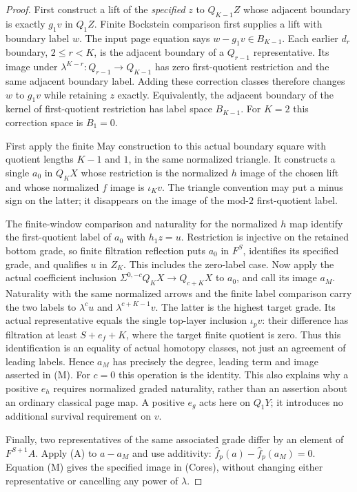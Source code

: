 \begin{proof}
First construct a lift of the \emph{specified} $z$ to $Q_{K-1}Z$ whose
adjacent boundary is exactly $g_1v$ in $Q_1Z$. Finite Bockstein comparison
first supplies a lift with boundary label $w$. The input page equation
says $w-g_1v\in B_{K-1}$. Each earlier $d_r$ boundary, $2\leq r<K$,
is the adjacent boundary of a $Q_{r-1}$ representative. Its image under
$\lambda^{K-r}:Q_{r-1}\to Q_{K-1}$ has zero first-quotient restriction
and the same adjacent boundary label. Adding these correction classes
therefore changes $w$ to $g_1v$ while retaining $z$ exactly.
Equivalently, the adjacent boundary of the kernel of first-quotient
restriction has label space $B_{K-1}$. For $K=2$ this correction space
is $B_1=0$.

First apply the finite May construction to this actual boundary square
with quotient lengths $K-1$ and $1$, in the same normalized triangle.
It constructs a single $a_0$ in $Q_KX$ whose restriction is the normalized
$h$ image of the chosen lift and whose normalized $f$ image is
$\iota_Kv$. The triangle convention may put a minus sign on the latter;
it disappears on the image of the mod-$2$ first-quotient label.

The finite-window comparison and naturality for the normalized $h$
map identify the first-quotient label of $a_0$ with $h_1z=u$.
Restriction is injective on the retained bottom grade, so finite
filtration reflection puts $a_0$ in $F^S$, identifies its specified
grade, and qualifies $u$ in $Z_K$. This includes the zero-label case.
Now apply the actual coefficient inclusion
$\Sigma^{0,-c}Q_KX\to Q_{c+K}X$ to $a_0$, and call its image $a_M$.
Naturality with the same normalized arrows and the finite label
comparison carry the two labels to $\lambda^cu$ and
$\lambda^{c+K-1}v$. The latter is the highest target grade.
Its actual representative equals the single top-layer inclusion
$\iota_pv$: their difference has filtration at least
$S+e_f+K$, where the target finite quotient is zero.
Thus this identification is an equality of actual homotopy classes,
not just an agreement of leading labels.
Hence $a_M$ has precisely the degree, leading term
and image asserted in (M). For $c=0$ this operation is the identity.
This also explains why a positive $e_h$ requires normalized graded
naturality, rather than an assertion about an ordinary classical page map.
A positive $e_g$ acts here on $Q_1Y$; it introduces no additional survival
requirement on $v$.

Finally, two representatives of the same associated grade differ by an
element of $F^{S+1}A$. Apply (A) to $a-a_M$ and use additivity:
$\widehat f_p(a)-\widehat f_p(a_M)=0$. Equation (M) gives the specified
image in (Cores), without changing either representative or cancelling
any power of $\lambda$.
\end{proof}

